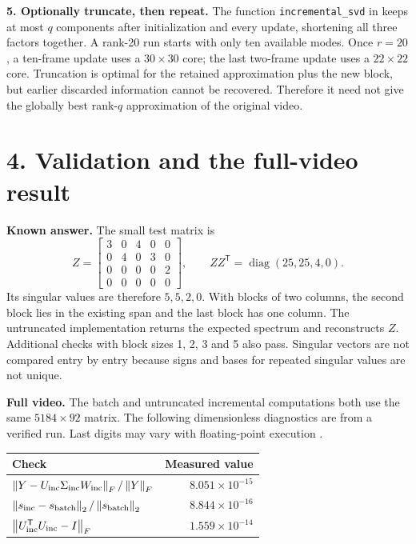 \documentclass[11pt,a4paper]{article}
\newcommand{\norm}[1]{\left\lVert #1\right\rVert}
\newcommand{\code}[1]{\texttt{#1}}
\begin{document}
\textbf{5. Optionally truncate, then repeat.}
The function \code{incremental\_svd} in  keeps at most \(q\)
components after initialization and every update, shortening all three
factors together. A rank-20 run starts with only ten available modes. Once
\(r=20\), a ten-frame update uses a \(30\times30\) core; the last two-frame
update uses a \(22\times22\) core. Truncation is optimal for the retained
approximation plus the new block, but earlier discarded information cannot
be recovered. Therefore it need not give the globally best rank-\(q\)
approximation of the original video.

\newpage
\section*{4. Validation and the full-video result}

\textbf{Known answer.}
The small test matrix is
\[
Z=\begin{bmatrix}
3&0&4&0&0\\
0&4&0&3&0\\
0&0&0&0&2\\
0&0&0&0&0
\end{bmatrix},
\qquad
ZZ^{\mathsf T}=\operatorname{diag}(25,25,4,0).
\]
Its singular values are therefore \(5,5,2,0\). With blocks of two columns,
the second block lies in the existing span and the last block has one
column. The untruncated implementation returns the expected spectrum and
reconstructs \(Z\). Additional checks with block sizes 1, 2, 3 and 5 also
pass. Singular vectors are not compared entry by entry because signs and
bases for repeated singular values are not unique.

\textbf{Full video.}
The batch and untruncated incremental computations both use the same
\(5184\times92\) matrix. The following dimensionless diagnostics are from a
verified run. Last digits may vary with floating-point execution \cite{numpy,sep25}.

\begin{center}
\renewcommand{\arraystretch}{1.4}
\begin{tabular}{@{}lr@{}}
\toprule
Check & Measured value\\
\midrule
\(\norm{Y-U_{\rm inc}\Sigma_{\rm inc}W_{\rm inc}}_F/\norm{Y}_F\)
& \(8.051\times10^{-15}\)\\
\(\norm{s_{\rm inc}-s_{\rm batch}}_2/\norm{s_{\rm batch}}_2\)
& \(8.844\times10^{-16}\)\\
\(\norm{U_{\rm inc}^{\mathsf T}U_{\rm inc}-I}_F\)
& \(1.559\times10^{-14}\)\\
\bottomrule
\end{tabular}
\end{center}
\end{document}
